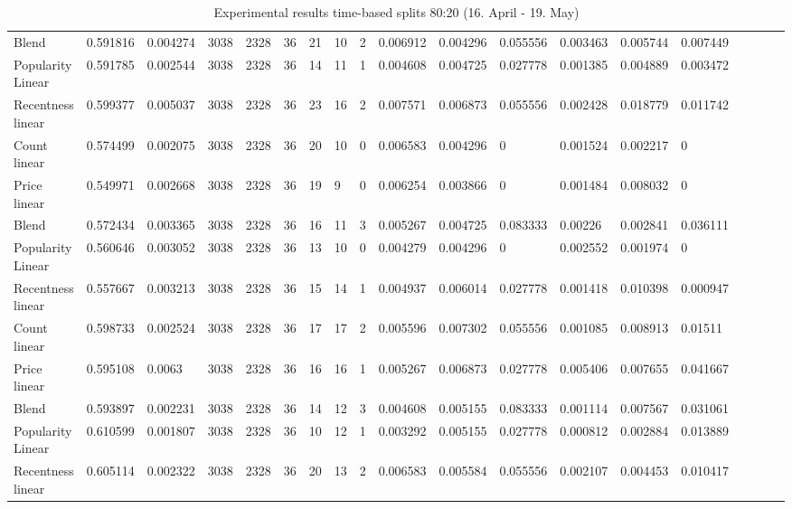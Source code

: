 \begin{table}[H]
{\begin{tabular}{*{19}l}
Blend				&	0.591816 &	0.004274 &	3038 &	2328 &	36 &	21 &	10 &	2 &	0.006912 &	0.004296 &	0.055556 &	0.003463 &	0.005744 &	0.007449 &	 \\
Popularity Linear	&	0.591785 &	0.002544 &	3038 &	2328 &	36 &	14 &	11 &	1 &	0.004608 &	0.004725 &	0.027778 &	0.001385 &	0.004889 &	0.003472 &	 \\
Recentness linear	&	0.599377 &	0.005037 &	3038 &	2328 &	36 &	23 &	16 &	2 &	0.007571 &	0.006873 &	0.055556 &	0.002428 &	0.018779 &	0.011742 &	 \\
Count linear		&	0.574499 &	0.002075 &	3038 &	2328 &	36 &	20 &	10 &	0 &	0.006583 &	0.004296 &	0 		 &	0.001524 &	0.002217 &	0 		 &	 \\
Price linear		&	0.549971 &	0.002668 &	3038 &	2328 &	36 &	19 &	9  &	0 &	0.006254 &	0.003866 &	0 		 &	0.001484 &	0.008032 &	0 		 &	 \\
Blend				&	0.572434 &	0.003365 &	3038 &	2328 &	36 &	16 &	11 &	3 &	0.005267 &	0.004725 &	0.083333 &	0.00226  &	0.002841 &	0.036111 &	 \\
Popularity Linear	&	0.560646 &	0.003052 &	3038 &	2328 &	36 &	13 &	10 &	0 &	0.004279 &	0.004296 &	0 		 &	0.002552 &	0.001974 &	0 		 &	 \\
Recentness linear	&	0.557667 &	0.003213 &	3038 &	2328 &	36 &	15 &	14 &	1 &	0.004937 &	0.006014 &	0.027778 &	0.001418 &	0.010398 &	0.000947 &	 \\
Count linear		&	0.598733 &	0.002524 &	3038 &	2328 &	36 &	17 &	17 &	2 &	0.005596 &	0.007302 &	0.055556 &	0.001085 &	0.008913 &	0.01511  &	 \\
Price linear		&	0.595108 &	0.0063 &	3038 &	2328 &	36 &	16 &	16 &	1 &	0.005267 &	0.006873 &	0.027778 &	0.005406 &	0.007655 &	0.041667 &	 \\
Blend				&	0.593897 &	0.002231 &	3038 &	2328 &	36 &	14 &	12 &	3 &	0.004608 &	0.005155 &	0.083333 &	0.001114 &	0.007567 &	0.031061 &	 \\
Popularity Linear	&	0.610599 &	0.001807 &	3038 &	2328 &	36 &	10 &	12 &	1 &	0.003292 &	0.005155 &	0.027778 &	0.000812 &	0.002884 &	0.013889 &	 \\
Recentness linear	&	0.605114 &	0.002322 &	3038 &	2328 &	36 &	20 &	13 &	2 &	0.006583 &	0.005584 &	0.055556 &	0.002107 &	0.004453 &	0.010417 &	 \\

\bottomrule
\end{tabular}
}
\caption{Experimental results time-based splits 80:20 (16. April - 19. May)}
\end{table}

